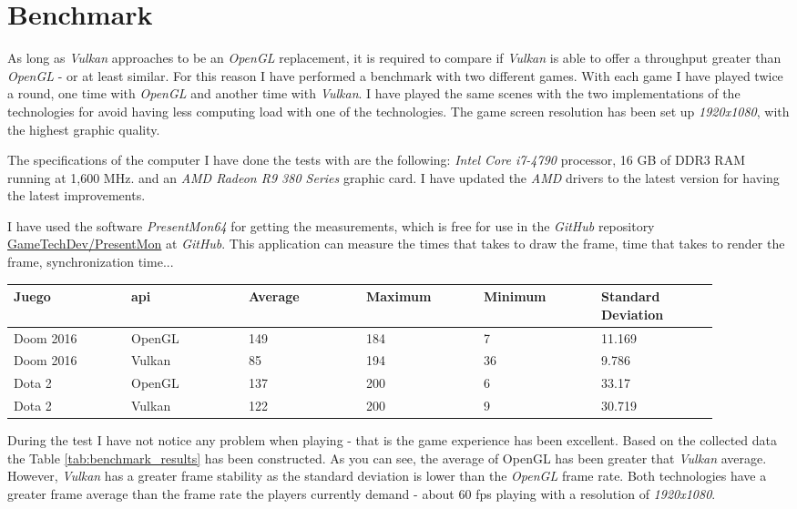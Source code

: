 \chapter{Benchmark}
As long as \emph{Vulkan} approaches to be an \emph{OpenGL} replacement, it is required to compare if \emph{Vulkan} is
able to offer
a throughput greater than \emph{OpenGL} - or at least similar. For this reason I have performed a benchmark with two
different games. With each game I have played twice a round, one time with \emph{OpenGL} and another time with
\emph{Vulkan}. I have played the same scenes with the two implementations of the technologies for avoid having less
computing load with one of the technologies. The game screen resolution has been set up \emph{1920x1080}, with the
highest graphic quality.

The specifications of the computer I have done the tests with are the following: \emph{Intel Core i7-4790} processor,
16 GB of DDR3 RAM running at 1,600 MHz. and an \emph{AMD Radeon R9 380 Series} graphic card. I have updated the
\emph{AMD} drivers to the latest version for having the latest improvements.

I have used the software \emph{PresentMon64} for getting the measurements, which is free for use in the \emph{GitHub}
repository \href{https://github.com/GameTechDev/PresentMon}{GameTechDev/PresentMon} at \emph{GitHub}. This application
can measure the times that takes to draw the frame, time that takes to render the frame, synchronization time...

\begin{table*}[t]
  \centering
  \begin{tabular}{p{0.15\linewidth}p{0.15\linewidth}p{0.15\linewidth}p{0.15\linewidth}p{0.15\linewidth}p{0.15\linewidth}}
    \toprule
    Juego & \gls{api}    & Average & Maximum & Minimum & Standard Deviation \\
    \midrule
    Doom 2016   & OpenGL  & 149 & 184 & 7   & 11.169 \\
    Doom 2016   & Vulkan  & 85  & 194 & 36  & 9.786 \\
    Dota 2      & OpenGL  & 137 & 200 & 6   & 33.17 \\
    Dota 2      & Vulkan  & 122 & 200 & 9   & 30.719 \\
    \bottomrule
  \end{tabular}
  \caption{Benchmark Results. Measured as \gls{fps}.}
  \label{tab:benchmark_results}
\end{table*}

During the test I have not notice any problem when playing - that is the game experience has been excellent. Based
on the collected data the Table \ref{tab:benchmark_results} has been constructed. As you can see, the average of
OpenGL has been greater that \emph{Vulkan} average. However, \emph{Vulkan} has a greater frame stability as the
standard deviation is lower than the \emph{OpenGL} frame rate. Both technologies have a greater frame average than the
frame rate the players currently demand - about 60 \gls{fps} playing with a resolution of \emph{1920x1080}.

